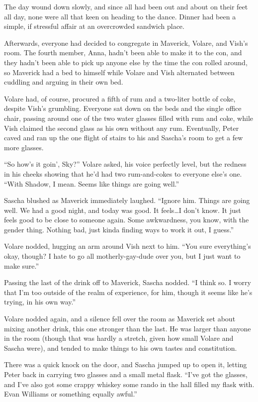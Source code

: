 \secdiv{}

The day wound down slowly, and since all had been out and about on their feet all day, none were all that keen on heading to the dance. Dinner had been a simple, if stressful affair at an overcrowded sandwich place.

Afterwards, everyone had decided to congregate in Maverick, Volare, and Vish's room. The fourth member, Anna, hadn't been able to make it to the con, and they hadn't been able to pick up anyone else by the time the con rolled around, so Maverick had a bed to himself while Volare and Vish alternated between cuddling and arguing in their own bed.

Volare had, of course, procured a fifth of rum and a two-liter bottle of coke, despite Vish's grumbling. Everyone sat down on the beds and the single office chair, passing around one of the two water glasses filled with rum and coke, while Vish claimed the second glass as his own without any rum. Eventually, Peter caved and ran up the one flight of stairs to his and Sascha's room to get a few more glasses.

``So how's it goin', Sky?'' Volare asked, his voice perfectly level, but the redness in his cheeks showing that he'd had two rum-and-cokes to everyone else's one. ``With Shadow, I mean. Seems like things are going well.''

Sascha blushed as Maverick immediately laughed. ``Ignore him. Things are going well. We had a good night, and today was good. It feels\ldots{}I don't know. It just feels good to be close to someone again. Some awkwardness, you know, with the gender thing. Nothing bad, just kinda finding ways to work it out, I guess.''

Volare nodded, hugging an arm around Vish next to him. ``You sure everything's okay, though? I hate to go all motherly-gay-dude over you, but I just want to make sure.''

Passing the last of the drink off to Maverick, Sascha nodded. ``I think so. I worry that I'm too outside of the realm of experience, for him, though it seems like he's trying, in his own way.''

Volare nodded again, and a silence fell over the room as Maverick set about mixing another drink, this one stronger than the last. He was larger than anyone in the room (though that was hardly a stretch, given how small Volare and Sascha were), and tended to make things to his own tastes and constitution.

There was a quick knock on the door, and Sascha jumped up to open it, letting Peter back in carrying two glasses and a small metal flask. ``I've got the glasses, and I've also got some crappy whiskey some rando in the hall filled my flask with. Evan Williams or something equally awful.''

